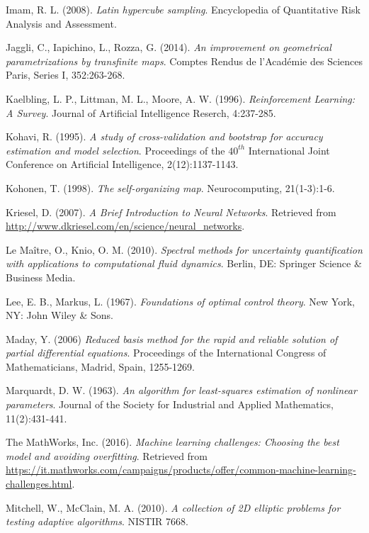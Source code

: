\documentclass{elsarticle}
\theoremstyle{theorem}
\theoremstyle{definition}
\theoremstyle{remark}
\theoremstyle{proposition}
\numberwithin{figure}{section}
\begin{document}
\begin{thebibliography}{50}
		Imam, R. L. (2008). \emph{Latin hypercube sampling}. Encyclopedia of Quantitative Risk Analysis and Assessment.
		
		Jaggli, C., Iapichino, L., Rozza, G. (2014). \emph{An improvement on geometrical parametrizations by transfinite maps}. Comptes Rendus de l'Acad\'emie des Sciences Paris, Series I, 352:263-268. 
				
		Kaelbling, L. P., Littman, M. L., Moore, A. W. (1996). \emph{Reinforcement Learning: A Survey}. Journal of Artificial Intelligence Reserch, 4:237-285.
		
		Kohavi, R. (1995). \emph{A study of cross-validation and bootstrap for accuracy estimation and model selection}. Proceedings of the $40^{th}$ International Joint Conference on Artificial Intelligence, 2(12):1137-1143.
		
		Kohonen, T. (1998). \emph{The self-organizing map}. Neurocomputing, 21(1-3):1-6.
		
		Kriesel, D. (2007). \emph{A Brief Introduction to Neural Networks}. Retrieved from \url{http://www.dkriesel.com/en/science/neural_networks}.
		
		Le Ma\^{i}tre, O., Knio, O. M. (2010). \emph{Spectral methods for uncertainty quantification with applications to computational fluid dynamics}. Berlin, DE: Springer Science \& Business Media.
		
		Lee, E. B., Markus, L. (1967). \emph{Foundations of optimal control theory}. New York, NY: John Wiley \& Sons.
		
		Maday, Y. (2006) \emph{Reduced basis method for the rapid and reliable solution of partial differential equations}. Proceedings of the International Congress of Mathematicians, Madrid, Spain, 1255-1269.
		
		Marquardt, D. W. (1963). \emph{An algorithm for least-squares estimation of nonlinear parameters}. Journal of the Society for Industrial and Applied Mathematics, 11(2):431-441.
		
		The MathWorks, Inc. (2016). \emph{Machine learning challenges: Choosing the best model and avoiding overfitting}. Retrieved from \url{https://it.mathworks.com/campaigns/products/offer/common-machine-learning-challenges.html}.
		
		Mitchell, W., McClain, M. A. (2010). \emph{A collection of 2D elliptic problems for testing adaptive algorithms}. NISTIR 7668.
		

\end{thebibliography}
\end{document}
